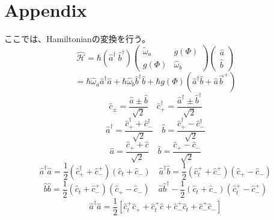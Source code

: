 \section{Appendix}
ここでは、Hamiltonianの変換を行う。
\begin{equation}
    \hat{\mathcal{H}}=\hbar\left(\hat{a}^{\dagger }\ \hat{b}^{\dagger }\right)\left(\begin{array}{cc}
    \tilde{\omega}_{a} & g(\Phi ) \\
    g(\Phi ) & \hat{\omega}_{b}
    \end{array}\right)\left(\begin{array}{l}
    \hat{a} \\
    \hat{b}
    \end{array}\right)
\end{equation}
\begin{equation}
    = \hbar \hat{\omega}_{a} \hat{a}^{\dagger} \hat{a}+\hbar \hat{\omega}_{b} \hat{b}^{\dagger} \hat{b}+\hbar g(\Phi)\left(\hat{a}^{\dagger}\hat{b}+\hat{a} \vec{b}^{+}\right)
\end{equation}
\begin{equation}
    \hat{c}_{\pm}=\frac{\hat{a} \pm \hat{b}}{\sqrt{2}} \quad \hat{c}_{+}^{\dagger}=\frac{\hat{a}^{\dagger} \pm \hat{b}^{\dagger}}{\sqrt{2}}
\end{equation}
\begin{equation}
    \hat{a}^{\dagger}=\frac{\hat{c}_{+}^{\dagger}+\hat{c}_{-}^{\dagger}}{\sqrt{2}} \quad \hat{b}=\frac{\hat{c}_{+}^{\dagger}-\hat{c}_{-}^{\dagger}}{\sqrt{2}}
\end{equation}
\begin{equation}
    \hat{a}=\frac{\hat{c}_{+}+\hat{c}}{\sqrt{2}} \quad \hat{b}=\frac{\hat{c}_{+}-\hat{c}_{-}}{\sqrt{2}}
\end{equation}
\begin{equation}
    \hat{a}^{\dagger} \hat{a}=\frac{1}{2}\left(\hat{c}_{+}^{\dagger}+\hat{c}_{-}^{+}\right)\left(\hat{c}_{t}+\hat{c}_{-}\right) \quad \hat{a}^{\dagger} \hat{b}=\frac{1}{2}\left(\hat{c}_{t}^{+}+\hat{c}_{-}^{+}\right)\left(\hat{c}_{+}-\hat{c}_{-}\right)
\end{equation}
\begin{equation}
    \hat{b} \hat{b}=\frac{1}{2}\left(\hat{c}_{t}+\hat{c}_{-}^{+}\right)\left(\hat{c}_{+}-\hat{c}_{-}\right) \quad \hat{a} \hat{b}^{\dagger}-\frac{1}{2}\left(\hat{c}_{t}+\hat{c}_{-}\right)\left(\hat{c}_{t}^{+}-\hat{c}_{-}^{+}\right)
\end{equation}
\begin{equation}
    \hat{a}^{\dagger} \hat{a}=\frac{1}{2}\left[\hat{c}_{t}^{+} \hat{c}_{+}+\hat{c}_{t}^{+} \hat{c}+\hat{c}_{-}^{+} \hat{c}_{t}+\hat{c}_{-}^{+} \hat{c}_{-}\right]
\end{equation}
